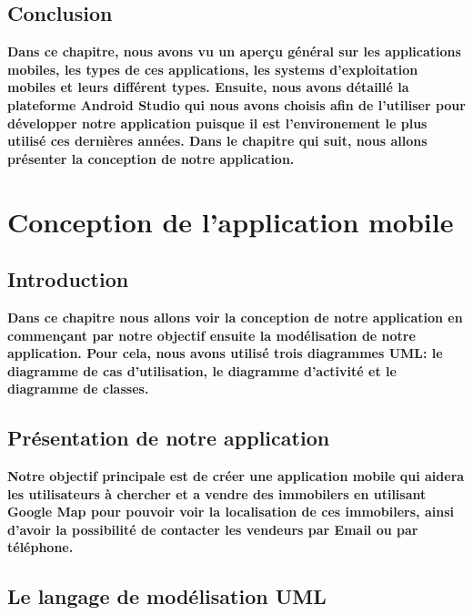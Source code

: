 \documentclass[french,a4,12pt]{report}
\begin{document}
\newpage
\begin{tcolorbox}[leftrule=3mm]
\section{Conclusion}
\end{tcolorbox}

\quad \textbf{ Dans ce chapitre, nous avons  vu un aperçu général sur les applications mobiles, les types de ces applications, les systems d'exploitation mobiles et leurs différent types. Ensuite, nous avons détaillé la plateforme Android Studio qui nous avons choisis afin de l'utiliser pour développer notre application puisque il est l'environement le plus utilisé ces dernières années.  
Dans le chapitre qui suit, nous allons présenter la conception de notre application.}
\pagestyle{fancy} 
\chapter{Conception de l'application mobile}
\chead{}
\lhead{\bfseries \chaptername {\,} \thechapter }
\cfoot{\bfseries \thepage}
\rhead{} 
\begin{tcolorbox}[leftrule=3mm]
	\section{Introduction}
\end{tcolorbox}
\textbf{Dans ce chapitre nous allons voir la conception de notre application en commençant par
notre objectif ensuite la modélisation de notre application. Pour cela, nous avons utilisé trois diagrammes UML: le diagramme de cas d’utilisation, le diagramme d'activité et le diagramme de classes.}

\begin{tcolorbox}[leftrule=3mm]
\section{Présentation de notre application}
\end{tcolorbox}
\textbf{Notre objectif principale est de créer une application mobile qui aidera les utilisateurs à chercher et a vendre des immobilers en utilisant  Google Map pour pouvoir voir la localisation de ces  immobilers, ainsi d’avoir la possibilité de  contacter les vendeurs par Email ou par  téléphone.}
\begin{tcolorbox}[leftrule=3mm]
\section{Le langage de modélisation UML}
\end{tcolorbox}
\end{document}

